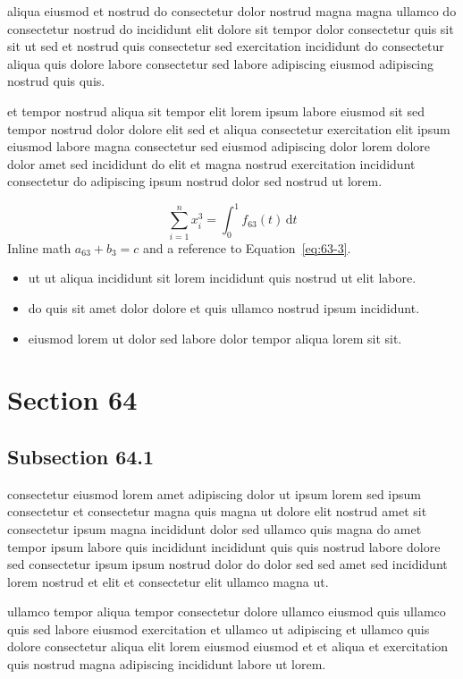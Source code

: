 \documentclass{article}
\begin{document}
aliqua eiusmod et nostrud do consectetur dolor nostrud magna magna ullamco do consectetur nostrud do incididunt elit dolore sit tempor dolor consectetur quis sit sit ut sed et nostrud quis consectetur sed exercitation incididunt do consectetur aliqua quis dolore labore consectetur sed labore adipiscing eiusmod adipiscing nostrud quis quis.

et tempor nostrud aliqua sit tempor elit lorem ipsum labore eiusmod sit sed tempor nostrud dolor dolore elit sed et aliqua consectetur exercitation elit ipsum eiusmod labore magna consectetur sed eiusmod adipiscing dolor lorem dolore dolor amet sed incididunt do elit et magna nostrud exercitation incididunt consectetur do adipiscing ipsum nostrud dolor sed nostrud ut lorem.

\begin{equation}\label{eq:63-3}
  \sum_{i=1}^{n} x_i^{3} = \int_0^1 f_{63}(t)\,\mathrm{d}t
\end{equation}
Inline math $a_{63} + b_{3} = c$ and a reference to Equation~\eqref{eq:63-3}.

\begin{itemize}
  \item ut ut aliqua incididunt sit lorem incididunt quis nostrud ut elit labore.
  \item do quis sit amet dolor dolore et quis ullamco nostrud ipsum incididunt.
  \item eiusmod lorem ut dolor sed labore dolor tempor aliqua lorem sit sit.
\end{itemize}

\section{Section 64}\label{sec:64}
\subsection{Subsection 64.1}\label{sec:64-1}
consectetur eiusmod lorem amet adipiscing dolor ut ipsum lorem sed ipsum consectetur et consectetur magna quis magna ut dolore elit nostrud amet sit consectetur ipsum magna incididunt dolor sed ullamco quis magna do amet tempor ipsum labore quis incididunt incididunt quis quis nostrud labore dolore sed consectetur ipsum ipsum nostrud dolor do dolor sed sed amet sed incididunt lorem nostrud et elit et consectetur elit ullamco magna ut.

ullamco tempor aliqua tempor consectetur dolore ullamco eiusmod quis ullamco quis sed labore eiusmod exercitation et ullamco ut adipiscing et ullamco quis dolore consectetur aliqua elit lorem eiusmod eiusmod et et aliqua et exercitation quis nostrud magna adipiscing incididunt labore ut lorem.
\end{document}
